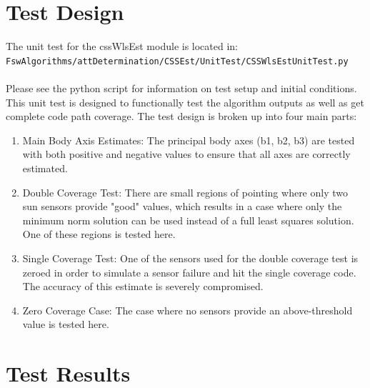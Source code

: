 \documentclass[]{LASPreport}
\begin{document}
\section{Test Design}
The unit test for the cssWlsEst module is located in:\\

\noindent
{\tt FswAlgorithms/attDetermination/CSSEst/UnitTest/CSSWlsEstUnitTest.py} \\
\\

Please see the python script for information on test setup and initial 
conditions.  \\

\noindent This unit test is designed to functionally test the algorithm 
outputs as well as get complete code path coverage.  The test design is broken 
up into four main parts:\\
\begin{enumerate}
\item{Main Body Axis Estimates: The principal body axes (b1, b2, b3) are tested 
   with both positive and negative values to ensure that all axes are correctly 
   estimated.}
\item{Double Coverage Test: There are small regions of pointing where only two 
   sun sensors provide "good" values, which results in a case where only the 
   minimum norm solution can be used instead of a full least squares solution.  
   One of these regions is tested here.}
\item{Single Coverage Test: One of the sensors used for the double coverage test 
   is zeroed in order to simulate a sensor failure and hit the single coverage 
   code.  The accuracy of this estimate is severely compromised.}
\item{Zero Coverage Case: The case where no sensors provide an above-threshold 
   value is tested here.}
\end{enumerate}


\section{Test Results}
\end{document}
